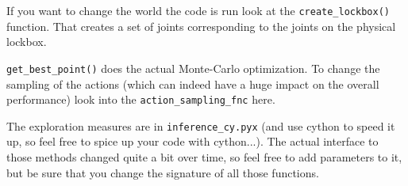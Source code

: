 \documentclass{article}
\begin{document}
If you want to change the world the code is run look at the
\verb+create_lockbox()+
function. That creates a set of joints corresponding to the joints on the
physical lockbox.

\verb+get_best_point()+ does the actual Monte-Carlo optimization. To change the
sampling of the actions (which can indeed have a huge impact on the overall
performance) look into the \verb+action_sampling_fnc+ here.

The exploration measures are in \verb+inference_cy.pyx+ (and use cython to speed
it up, so feel free to spice up your code with cython...). The actual interface
to those methods changed quite a bit over time, so feel free to add parameters
to it, but be sure that you change the signature of all those functions.
\printbibliography[heading=bibintoc]
\end{document}

